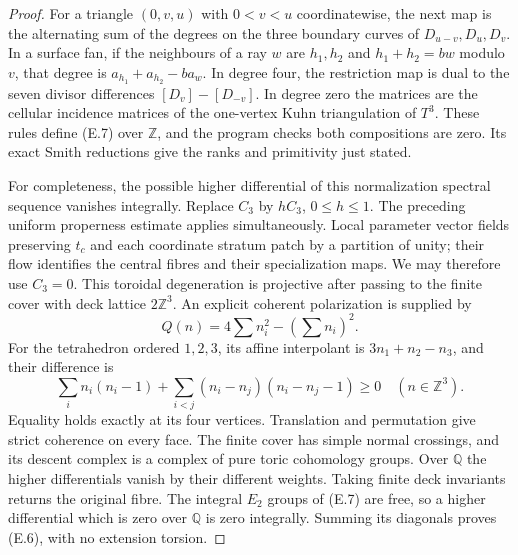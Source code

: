 \begin{proof}
For a triangle $(0,v,u)$ with $0<v<u$ coordinatewise, the next map
is the alternating sum of the degrees on the three boundary curves
of $D_{u-v},D_u,D_v$.  In a surface fan, if the neighbours of a ray
$w$ are $h_1,h_2$ and $h_1+h_2=bw$ modulo $v$, that degree is
$a_{h_1}+a_{h_2}-ba_w$.  In degree four, the restriction map is dual
to the seven divisor differences $[D_v]-[D_{-v}]$.  In degree zero
the matrices are the cellular incidence matrices of the one-vertex
Kuhn triangulation of $T^3$.  These rules define (E.7) over
$\mathbb Z$, and the program checks both compositions are zero.
Its exact Smith reductions give the ranks and primitivity just stated.

For completeness, the possible higher differential of this
normalization spectral sequence vanishes integrally.  Replace $C_3$
by $hC_3$, $0\leq h\leq1$.  The preceding uniform properness estimate
applies simultaneously.  Local parameter vector fields preserving
$t_c$ and each coordinate stratum patch by a partition of unity;
their flow identifies the central fibres and their specialization
maps.  We may therefore use $C_3=0$.  This toroidal degeneration is
projective after passing to the finite cover with deck lattice
$2\mathbb Z^3$.  An explicit coherent polarization is supplied by
\[
 Q(n)=4\sum n_i^2-(\sum n_i)^2.
\]
For the tetrahedron ordered $1,2,3$, its affine interpolant is
$3n_1+n_2-n_3$, and their difference is
\[
 \sum_i n_i(n_i-1)+
 \sum_{i<j}(n_i-n_j)(n_i-n_j-1)\geq0
 \quad(n\in\mathbb Z^3).
\]
Equality holds exactly at its four vertices.  Translation and
permutation give strict coherence on every face.  The finite cover
has simple normal crossings, and its descent complex is a complex
of pure toric cohomology groups.  Over $\mathbb Q$ the higher
differentials vanish by their different weights.  Taking finite
deck invariants returns the original fibre.  The integral $E_2$
groups of (E.7) are free, so a higher differential which is zero
over $\mathbb Q$ is zero integrally.  Summing its diagonals proves
(E.6), with no extension torsion.


\end{proof}
